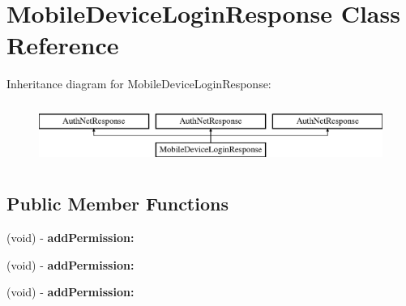 \hypertarget{interface_mobile_device_login_response}{
\section{MobileDeviceLoginResponse Class Reference}
\label{interface_mobile_device_login_response}
}
Inheritance diagram for MobileDeviceLoginResponse:\begin{figure}[H]
\begin{center}
\leavevmode
\includegraphics[height=2.000000cm]{interface_mobile_device_login_response}
\end{center}
\end{figure}
\subsection*{Public Member Functions}
\begin{DoxyCompactItemize}
\item 
\hypertarget{interface_mobile_device_login_response_aa747ee85d917a10b4c9a333f4fdffbee}{
(void) -\/ {\bfseries addPermission:}}
\label{interface_mobile_device_login_response_aa747ee85d917a10b4c9a333f4fdffbee}

\item 
\hypertarget{interface_mobile_device_login_response_aa747ee85d917a10b4c9a333f4fdffbee}{
(void) -\/ {\bfseries addPermission:}}
\label{interface_mobile_device_login_response_aa747ee85d917a10b4c9a333f4fdffbee}

\item 
\hypertarget{interface_mobile_device_login_response_aa747ee85d917a10b4c9a333f4fdffbee}{
(void) -\/ {\bfseries addPermission:}}
\label{interface_mobile_device_login_response_aa747ee85d917a10b4c9a333f4fdffbee}

\end{DoxyCompactItemize}
